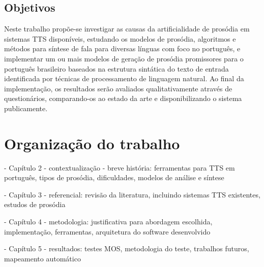 \subsection{Objetivos}
Neste trabalho propõe-se investigar as causas da artificialidade de prosódia em sistemas TTS disponíveis, estudando os modelos de prosódia, algoritmos e métodos para síntese de fala para diversas línguas com foco no português, e implementar um ou mais modelos de geração de prosódia promissores para o português brasileiro baseados na estrutura sintática do texto de entrada identificada por técnicas de processamento de linguagem natural. Ao final da implementação, os resultados serão avaliados qualitativamente através de questionários, compa\-rando-os ao estado da arte e disponibilizando o sistema publicamente.

\section{Organização do trabalho}

- Capítulo 2 - contextualização - breve história:
ferramentas para TTS em português, tipos de prosódia, dificuldades, modelos de
análise e síntese

- Capítulo 3 - referencial:
revisão da literatura, incluindo sistemas TTS existentes, estudos de prosódia

- Capítulo 4 - metodologia:
justificativa para abordagem escolhida, implementação, ferramentas, arquitetura
do software desenvolvido

- Capítulo 5 - resultados:
testes MOS, metodologia do teste, trabalhos futuros, mapeamento automático

